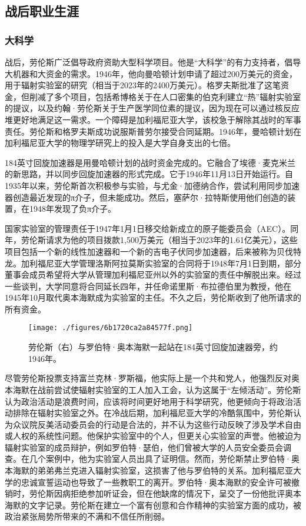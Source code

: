 \subsection{战后职业生涯}
\subsubsection{大科学}
战后，劳伦斯广泛倡导政府资助大型科学项目。他是“大科学”的有力支持者，倡导大机器和大资金的需求。1946年，他向曼哈顿计划申请了超过200万美元的资金，用于辐射实验室的研究（相当于2023年的2400万美元）。格罗夫斯批准了这笔资金，但削减了多个项目，包括希博格关于在人口密集的伯克利建立“热”辐射实验室的提议，以及约翰·劳伦斯关于生产医学同位素的提议，因为现在可以通过核反应堆更好地满足这一需求。一个障碍是加利福尼亚大学，该校急于解除其战时的军事责任。劳伦斯和格罗夫斯成功说服斯普劳尔接受合同延期。1946年，曼哈顿计划在加利福尼亚大学的物理学研究上的投入是大学自身支出的七倍。

184英寸回旋加速器是用曼哈顿计划的战时资金完成的。它融合了埃德·麦克米兰的新思路，并以同步回旋加速器的形式完成。它于1946年11月13日开始运行。自1935年以来，劳伦斯首次积极参与实验，与尤金·加德纳合作，尝试利用同步加速器创造最近发现的π介子，但未能成功。然后，塞萨尔·拉特斯使用他们创造的装置，在1948年发现了负π介子。

国家实验室的管理责任于1947年1月1日移交给新成立的原子能委员会（AEC）。同年，劳伦斯请求为他的项目拨款1,500万美元（相当于2023年的1.61亿美元），这些项目包括一个新的线性加速器和一个新的吉电子伏同步加速器，后来被称为贝伐特龙。加利福尼亚大学管理洛斯阿拉莫斯实验室的合同将于1948年7月1日到期，部分董事会成员希望将大学从管理加利福尼亚州以外的实验室的责任中解脱出来。经过一些谈判，大学同意将合同延长四年，并任命诺里斯·布拉德伯里为教授，他在1945年10月取代奥本海默成为实验室的主任。不久之后，劳伦斯收到了他所请求的所有资金。
\begin{figure}[ht]
\centering
\texttt{[image: ./figures/6b1720ca2a84577f.png]}
\caption{劳伦斯（右）与罗伯特·奥本海默一起站在184英寸回旋加速器旁，约1946年。} \label{fig_ONST_7}
\end{figure}
尽管劳伦斯投票支持富兰克林·罗斯福，他实际上是一个共和党人，他强烈反对奥本海默在战前尝试使辐射实验室的工人加入工会，认为这属于“左倾活动”。劳伦斯认为政治活动是浪费时间，应该将时间更好地用于科学研究，他更倾向于将政治活动排除在辐射实验室之外。在冷战后期，加利福尼亚大学的冷酷氛围中，劳伦斯认为众议院反美活动委员会的行动是合法的，并不认为这些行动反映了涉及学术自由或人权的系统性问题。他保护实验室中的个人，但更关心实验室的声誉。他被迫为辐射实验室的成员辩护，例如罗伯特·瑟伯，他们曾被大学的人员安全委员会调查。在几个案例中，他为实验室人员出具了证明信。然而，劳伦斯禁止罗伯特·奥本海默的弟弟弗兰克进入辐射实验室，这损害了他与罗伯特的关系。加利福尼亚大学的忠诚宣誓运动也导致了一些教职工的离开。罗伯特·奥本海默的安全许可被撤销时，劳伦斯因病拒绝参加听证会，但在他缺席的情况下，呈交了一份他批评奥本海默的文字记录。劳伦斯在建立一个富有创意和合作精神的实验室方面的成功，被政治紧张局势所带来的不满和不信任所削弱。
